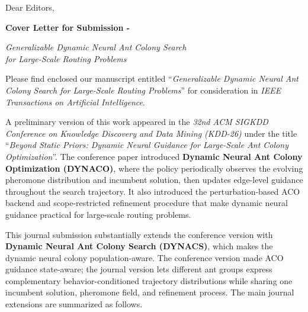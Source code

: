 \documentclass[11pt]{letter}
\begin{document}

\begin{letter}{
Dear Editors,
}

\begin{center}
\large\bfseries
Cover Letter for Submission -

\emph{Generalizable Dynamic Neural Ant Colony Search \\ for Large-Scale Routing Problems}
\end{center}

\opening{}

Please find enclosed our manuscript entitled ``\emph{Generalizable Dynamic Neural Ant Colony Search for Large-Scale Routing Problems}'' for consideration in \emph{IEEE Transactions on Artificial Intelligence}.
\vspace{6pt}

A preliminary version of this work appeared in the \emph{32nd ACM SIGKDD Conference on Knowledge Discovery and Data Mining (KDD-26)} under the title ``\emph{Beyond Static Priors: Dynamic Neural Guidance for Large-Scale Ant Colony Optimization}''. The conference paper introduced \textbf{Dynamic Neural Ant Colony Optimization (DYNACO)}, where the policy periodically observes the evolving pheromone distribution and incumbent solution, then updates edge-level guidance throughout the search trajectory. It also introduced the perturbation-based ACO backend and scope-restricted refinement procedure that make dynamic neural guidance practical for large-scale routing problems.

This journal submission substantially extends the conference version with \textbf{Dynamic Neural Ant Colony Search (DYNACS)}, which makes the dynamic neural colony population-aware. The conference version made ACO guidance state-aware; the journal version lets different ant groups express complementary behavior-conditioned trajectory distributions while sharing one incumbent solution, pheromone field, and refinement process. The main journal extensions are summarized as follows.
\vspace{-5pt}


\end{letter}
\end{document}
